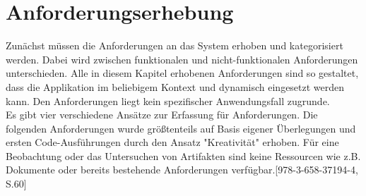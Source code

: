 \documentclass[10pt]{article}
\begin{document}
\section{Anforderungserhebung}
Zunächst müssen die Anforderungen an das System erhoben und kategorisiert werden. Dabei wird zwischen funktionalen und nicht-funktionalen Anforderungen unterschieden. Alle in diesem Kapitel erhobenen Anforderungen sind so gestaltet, dass die Applikation im beliebigem Kontext  und dynamisch eingesetzt werden kann. Den Anforderungen liegt kein spezifischer Anwendungsfall zugrunde.\\
Es gibt vier verschiedene Ansätze zur Erfassung für Anforderungen. Die folgenden Anforderungen wurde größtenteils auf Basis eigener Überlegungen und ersten Code-Ausführungen durch den Ansatz "Kreativität" erhoben. Für eine Beobachtung oder das Untersuchen von Artifakten sind keine Ressourcen wie z.B. Dokumente oder bereits bestehende Anforderungen verfügbar.[978-3-658-37194-4, S.60]
\end{document}
